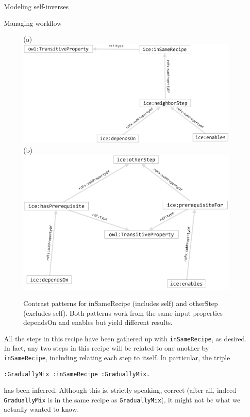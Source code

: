 \begin{challenge}{Modeling self-inverses}
\begin{challenge}{Managing workflow}
\begin{figure}
\centering
(a)
\includegraphics[width=5in]{SWWOv3/media/ch9/figure9-8a.png}
(b)
\includegraphics[width=5in]{SWWOv3/media/ch9/figure9-8b.png}
\caption{Contrast patterns for inSameRecipe (includes self) and otherStep
(excludes self). Both patterns work from the same input properties
dependsOn and enables but yield different results.}
\label{fig:ch9.8}
\end{figure}



All the steps in this recipe have been gathered up with \texttt{inSameRecipe}, as
desired. In fact, any two steps in this recipe will be related to one
another by \texttt{inSameRecipe}, including relating each step to itself. In
particular, the triple

\begin{lstlisting}
:GraduallyMix :inSameRecipe :GraduallyMix.
\end{lstlisting}

has been inferred. Although this is, strictly speaking, correct (after
all, indeed \texttt{GraduallyMix} is in the same recipe as \texttt{GraduallyMix}), it
might not be what we actually wanted to know.
\end{challenge}



\end{challenge}
